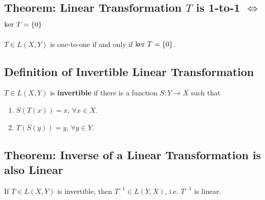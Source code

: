 \documentclass[11pt]{elegantbook}
\begin{document}
\subsection{Theorem: Linear Transformation $T$ is 1-to-1 $\Leftrightarrow$ $\textnormal{ker }T = \{0\}$}
\begin{theorem}[1-to-1 $\Leftrightarrow$ $\textnormal{ker }T = \{0\}$]
    $T \in L(X, Y)$ is one-to-one if and only if $\textnormal{ker }T = \{0\}$.
\end{theorem}


\subsection{Definition of Invertible Linear Transformation}
\begin{definition}
    \normalfont
    $T \in L(X, Y)$ is \textbf{invertible} if there is a function $S : Y \rightarrow X$ such that
    \begin{enumerate}
        \item $S(T(x))=x$, $\forall x\in X$.
        \item $T(S(y))=y$, $\forall y\in Y$.
    \end{enumerate}
\end{definition}

\subsection{Theorem: Inverse of a Linear Transformation is also Linear}
\begin{theorem}
    If $T \in L(X, Y)$ is invertible, then $T^{-1} \in L(Y, X)$, i.e. $T^{-1}$ is linear.
\end{theorem}
\end{document}
